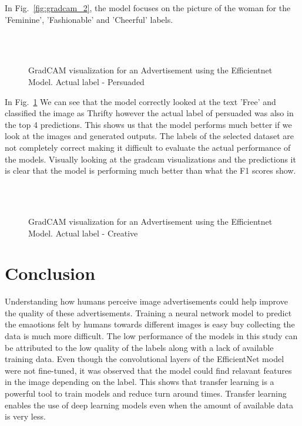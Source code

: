 \documentclass[conference]{IEEEtran}
\begin{document}
In Fig.~\ref{fig:gradcam_2}, the model focuses on the picture of the woman for the 'Feminine', 'Fashionable' and 'Cheerful' labels.

\begin{figure}
    
    \\
    \\
    \caption{GradCAM visualization for an Advertisement using the Efficientnet Model. Actual label - Persuaded}
    \label{fig:gradcam_9}
  \end{figure}

In Fig.~\ref{fig:gradcam_9} We can see that the model correctly looked at the text 'Free' and classified the image as Thrifty however the actual label of persuaded was also in the top 4 predictions. This shows us that the model performs much better if we look at the images and generated outputs. The labels of the selected dataset are not completely correct making it difficult to evaluate the actual performance of the models. Visually looking at the gradcam visualizations and the predictions it is clear that the model is performing much better than what the F1 scores show.

\begin{figure}
    
    \\
    \\
    \caption{GradCAM visualization for an Advertisement using the Efficientnet Model. Actual label - Creative}
    \label{fig:gradcam_7}
  \end{figure}


\section{Conclusion}

Understanding how humans perceive image advertisements could help improve the quality of these advertisements. Training a neural network model to predict the emaotions felt by humans towards different images is easy buy collecting the data is much more difficult. The low performance of the models in this study can be attributed to the low quality of the labels along with a lack of available training data. Even though the convolutional layers of the EfficientNet model were not fine-tuned, it was observed that the model could find relavant features in the image depending on the label. This shows that transfer learning is a powerful tool to train models and reduce turn around times. Transfer learning enables the use of deep learning models even when the amount of available data is very less. 
\end{document}
